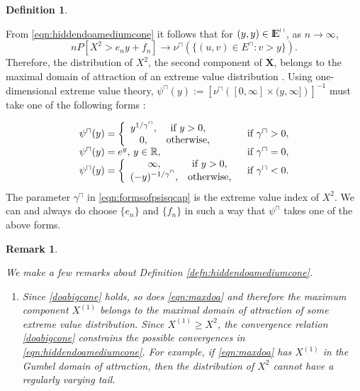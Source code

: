 \documentclass[11 pt]{amsart}
\newtheorem{defn}[thm]{Definition}
\newtheorem{rem}[thm]{Remark}
\numberwithin{equation}{section}
\begin{document}
{{\begin{defn}
{{}}
\end{defn}
From \eqref{eqn:hiddendoamediumcone} it follows that  for $(y,y) \in {\mathop{\rm I\kern -0.20em E}\nolimits}^{\sqcap}$, as $n \to \infty$,
\begin{equation}\label{eqn:scompdoa}
nP[ X^2 > e_ny + f_n] \to \nu^{\sqcap}\left( \{(u,v)\in E^\sqcap: v>y\} \right).
\end{equation}
Therefore, the distribution of $X^2$, {the second component of
  ${\boldsymbol X}$,} belongs to the maximal domain of attraction of an extreme
value distribution \cite[page 4]{dehaan:ferreira:2006}. Using
one-dimensional extreme value theory, $\psi^{\sqcap}(y) :=
{\left[\nu^{\sqcap}\left([0, \infty] \times (y, \infty] \right)
  \right]}^{-1}$ must take one of the following forms \cite[page
9]{resnickbook:2008}: 

\begin{align}\label{eqn:formsofpsisqcap}
\begin{array}{lc}
 \psi^{\sqcap}(y) = \left \{ \begin{array}{cc}
y^{1/\gamma^{\sqcap}}, & \hbox{if $y >0$,}\\
0, & \hbox{otherwise,}
\end{array} \right. & \hbox{if $ \gamma^{\sqcap} > 0,$}\\
 \psi^{\sqcap}(y) = e^{y}, \, y \in \mathbb{R},&  \hbox{if $ \gamma^{\sqcap} = 0,$}\\
 \psi^{\sqcap}(y) = \left \{ \begin{array}{cc}
\infty, & \hbox{if $y > 0$,}\\
(-y)^{-1/\gamma^{\sqcap}}, & \hbox{otherwise,}
\end{array} \right. & \hbox{if $ \gamma^{\sqcap} < 0.$}
\end{array}
\end{align}
The parameter $\gamma^{\sqcap}$ in \eqref{eqn:formsofpsisqcap} is the
extreme value index of $X^2$. We {can and always do}  choose $\{ e_n \}$ and $\{ f_n
\}$ in such a way that $\psi^{\sqcap}$ takes one of the above
forms. 

\begin{rem}\label{rem:hiddendoamediumcone}
{\rm{ We make a few remarks about Definition \ref{defn:hiddendoamediumcone}.

\begin{enumerate}
\item  {Since \eqref{doabigcone} holds, so does}
  \eqref{eqn:maxdoa} {and therefore} the maximum component
  $X^{(1)}$ belongs to the maximal domain of attraction of some
  extreme value distribution. Since $X^{(1)} \ge X^2$, the convergence
  relation \eqref{doabigcone} {constrains the}
  possible convergences {in}
  \eqref{eqn:hiddendoamediumcone}. For example, if
  {\eqref{eqn:maxdoa} has} 
  $X^{(1)}$ in the Gumbel domain of
  attraction, then the distribution of $X^2$ cannot have a
  regularly varying tail.


\end{enumerate}}}
\end{rem}}}
\end{document}
